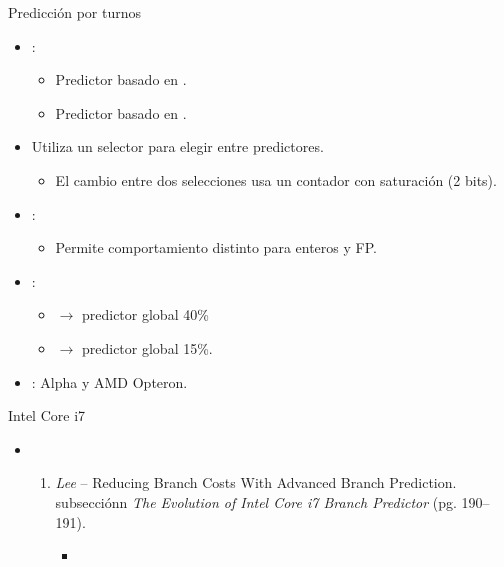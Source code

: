 \begin{frame}[t]{Predicción por turnos}
\begin{itemize}
  \item {}:
    \begin{itemize}
      \item Predictor basado en .
      \item Predictor basado en .
    \end{itemize}
  \item Utiliza un selector para elegir entre predictores.
    \begin{itemize}
      \item El cambio entre dos selecciones usa un contador con saturación (2 bits).
    \end{itemize}
  \item {}:
    \begin{itemize}
      \item Permite comportamiento distinto para enteros y FP.
    \end{itemize}
  \item {}:
    \begin{itemize}
      \item {} $\rightarrow$ predictor global 40\%
      \item {} $\rightarrow$ predictor global 15\%.
    \end{itemize}
  \item {}: Alpha y AMD Opteron.
\end{itemize}
\end{frame}

\begin{frame}[t]{Intel Core i7}
\begin{itemize}
  \item {}
    \begin{enumerate}
      \item \emph{Lee}  -- 
            Reducing Branch Costs With Advanced Branch Prediction.\\
             subsecciónn 
            \emph{The Evolution of Intel Core i7 Branch Predictor}
            (pg. 190--191).
        \begin{itemize}
          \item \bibhennessy
        \end{itemize}
    \end{enumerate}
\end{itemize}
\end{frame}
